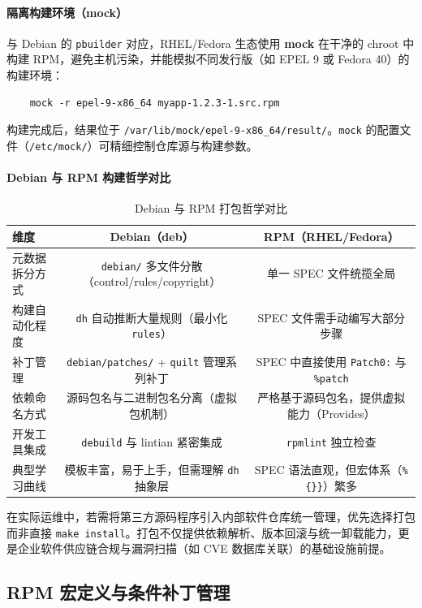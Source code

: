 \documentclass[12pt,UTF8]{ctexbook}
\begin{document}
\paragraph{隔离构建环境（mock）}
与 Debian 的 \texttt{pbuilder} 对应，RHEL/Fedora 生态使用 \textbf{mock} 在干净的 chroot 中构建 RPM，避免主机污染，并能模拟不同发行版（如 EPEL 9 或 Fedora 40）的构建环境：
\begin{verbatim}
	mock -r epel-9-x86_64 myapp-1.2.3-1.src.rpm
\end{verbatim}
构建完成后，结果位于 \texttt{/var/lib/mock/epel-9-x86\_64/result/}。\texttt{mock} 的配置文件（\texttt{/etc/mock/}）可精细控制仓库源与构建参数。

\paragraph{Debian 与 RPM 构建哲学对比}

\begin{table}[htbp]
	\centering
	\caption{Debian 与 RPM 打包哲学对比}
	\begin{tabular}{@{}lcc@{}}
		\toprule
		\textbf{维度} & \textbf{Debian（deb）} & \textbf{RPM（RHEL/Fedora）} \\
		\midrule
		元数据拆分方式 & \texttt{debian/} 多文件分散（control/rules/copyright） & 单一 SPEC 文件统揽全局 \\
		构建自动化程度 & \texttt{dh} 自动推断大量规则（最小化 \texttt{rules}） & SPEC 文件需手动编写大部分步骤 \\
		补丁管理 & \texttt{debian/patches/} + \texttt{quilt} 管理系列补丁 & SPEC 中直接使用 \texttt{Patch0:} 与 \texttt{\%patch} \\
		依赖命名方式 & 源码包名与二进制包名分离（虚拟包机制） & 严格基于源码包名，提供虚拟能力（Provides） \\
		开发工具集成 & \texttt{debuild} 与 lintian 紧密集成 & \texttt{rpmlint} 独立检查 \\
		典型学习曲线 & 模板丰富，易于上手，但需理解 \texttt{dh} 抽象层 & SPEC 语法直观，但宏体系（\texttt{\%\{\}\}}）繁多 \\
		\bottomrule
	\end{tabular}
\end{table}

在实际运维中，若需将第三方源码程序引入内部软件仓库统一管理，优先选择打包而非直接 \texttt{make install}。打包不仅提供依赖解析、版本回滚与统一卸载能力，更是企业软件供应链合规与漏洞扫描（如 CVE 数据库关联）的基础设施前提。

\subsection{RPM 宏定义与条件补丁管理}
\end{document}
